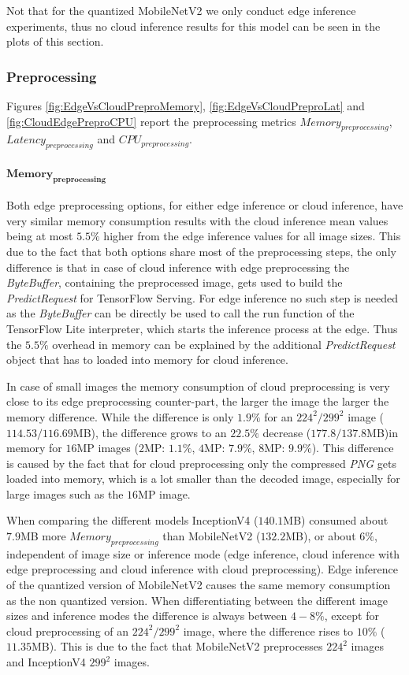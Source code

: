 Not that for the quantized MobileNetV2 we only conduct edge inference experiments, thus no cloud inference results for this model can be seen in the plots of this section.
\subsubsection{Preprocessing}

Figures \ref{fig:EdgeVsCloudPreproMemory}, \ref{fig:EdgeVsCloudPreproLat} and \ref{fig:CloudEdgePreproCPU} report the preprocessing metrics $Memory_{preprocessing}$, $Latency_{preprocessing}$ and $CPU_{preprocessing}$.

\paragraph{$\mathbf{Memory_{preprocessing}}$}
Both edge preprocessing options, for either edge inference or cloud inference, have very similar memory consumption results with the cloud inference mean values being at most $5.5\%$ higher from the edge inference values for all image sizes.
This due to the fact that both options share most of the preprocessing steps, the only difference is that in case of cloud inference with edge preprocessing the \emph{ByteBuffer}, containing the preprocessed image, gets used to build the \emph{PredictRequest} for TensorFlow Serving. 
For edge inference no such step is needed as the \emph{ByteBuffer} can be directly be used to call the run function of the TensorFlow Lite interpreter, which starts the inference process at the edge.
Thus the $5.5\%$ overhead in memory can be explained by the additional \emph{PredictRequest} object that has to loaded into memory for cloud inference.

In case of small images the memory consumption of cloud preprocessing is very close to its edge preprocessing counter-part, the larger the image the larger the memory difference.
While the difference is only $1.9\%$ for an $224^2/299^2$ image ($114.53/116.69$MB), the difference grows to an $22.5\%$ decrease ($177.8/137.8$MB)in memory for $16$MP images ($2$MP: $1.1\%$, $4$MP: $7.9\%$, $8$MP: $9.9\%$).
This difference is caused by the fact that for cloud preprocessing only the compressed \emph{PNG} gets loaded into memory, which is a lot smaller than the decoded image, especially for large images such as the $16$MP image.

When comparing the different models InceptionV4 ($140.1$MB) consumed about $7.9$MB more $Memory_{preprocessing}$ than MobileNetV2 ($132.2$MB), or about $6\%$, independent of image size or inference mode (edge inference, cloud inference with edge preprocessing and cloud inference with cloud preprocessing).
Edge inference of the quantized version of MobileNetV2 causes the same memory consumption as the non quantized version.
When differentiating between the different image sizes and inference modes the difference is always between $4-8\%$, except for cloud preprocessing of an $224^2/299^2$ image, where the difference rises to $10\%$ ($11.35$MB). This is due to the fact that MobileNetV2 preprocesses $224^2$ images and InceptionV4 $299^2$ images.

